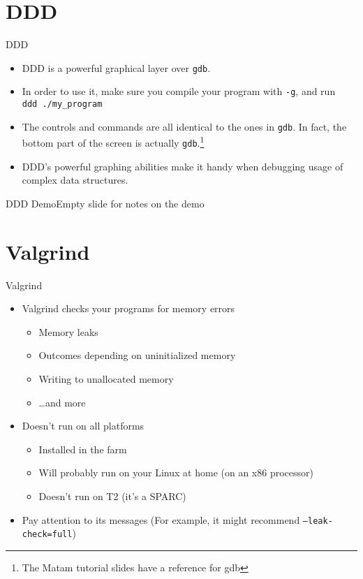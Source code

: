 \documentclass{beamer}
\begin{document}
\section{DDD}

\begin{frame}{DDD}
  \begin{itemize}
    \item DDD is a powerful graphical layer over \texttt{gdb}.
    \item In order to use it, make sure you compile your program with
      \texttt{-g}, and run \\
      \texttt{ddd ./my\_program}
    \item The controls and commands are all identical to the ones in
      \texttt{gdb}. In fact, the bottom part of the screen is actually
      \texttt{gdb}.\footnote{The Matam tutorial slides have a reference
      for gdb}
    \item DDD's powerful graphing abilities make it handy when debugging
      usage of complex data structures.
  \end{itemize}
\end{frame}

 {
\begin{frame}{DDD Demo}{Empty slide for notes on the demo}
\end{frame}
}

\section{Valgrind}

\begin{frame}{Valgrind}
  \begin{itemize}
    \item Valgrind checks your programs for memory errors
      \begin{itemize}
        \item Memory leaks
        \item Outcomes depending on uninitialized memory
        \item Writing to unallocated memory
        \item \ldots{}and more
      \end{itemize}
    \item Doesn't run on all platforms
      \begin{itemize}
        \item Installed in the farm
        \item Will probably run on your Linux at home (on an x86 processor)
        \item Doesn't run on T2 (it's a SPARC)
      \end{itemize}
    \item Pay attention to its messages (For example, it might recommend
      \texttt{--leak-check=full})
  \end{itemize}
\end{frame}
\end{document}
